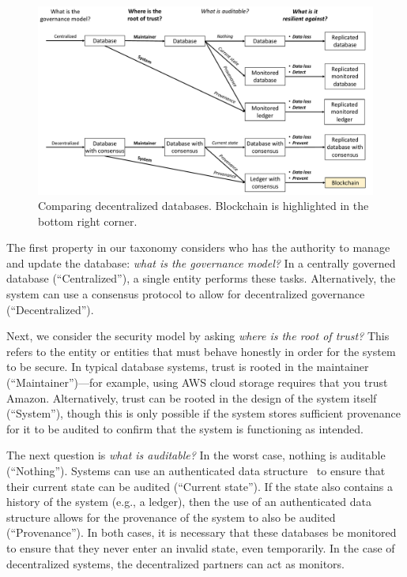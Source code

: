 \begin{figure}
	\centering
	\includegraphics[width=\textwidth]{figures/BlockchainFlowchart}
	\caption{Comparing decentralized databases. Blockchain is highlighted in the bottom right corner.}
	\label{fig:blockchainFlowchart}
\end{figure}

The first property in our taxonomy considers who has the authority to manage and update the database: \emph{what is the governance model?} In a centrally governed database (``Centralized''), a single entity performs these tasks. Alternatively, the system can use a consensus protocol to allow for decentralized governance (``Decentralized'').

Next, we consider the security model by asking \emph{where is the root of trust?}
This refers to the entity or entities that must behave honestly in order for the system to be secure.
In typical database systems, trust is rooted in the maintainer (``Maintainer'')---for example, using AWS cloud storage requires that you trust Amazon.
Alternatively, trust can be rooted in the design of the system itself (``System''), though this is only possible if the system stores sufficient provenance for it to be audited to confirm that the system is functioning as intended.

The next question is \emph{what is auditable?}
In the worst case, nothing is auditable (``Nothing'').
Systems can use an authenticated data structure~\cite{tamassia2003authenticated} to ensure that their current state can be audited (``Current state'').
If the state also contains a history of the system (e.g., a ledger), then the use of an authenticated data structure allows for the provenance of the system to also be audited (``Provenance'').
In both cases, it is necessary that these databases be monitored to ensure that they never enter an invalid state, even temporarily.
In the case of decentralized systems, the decentralized partners can act as monitors.


